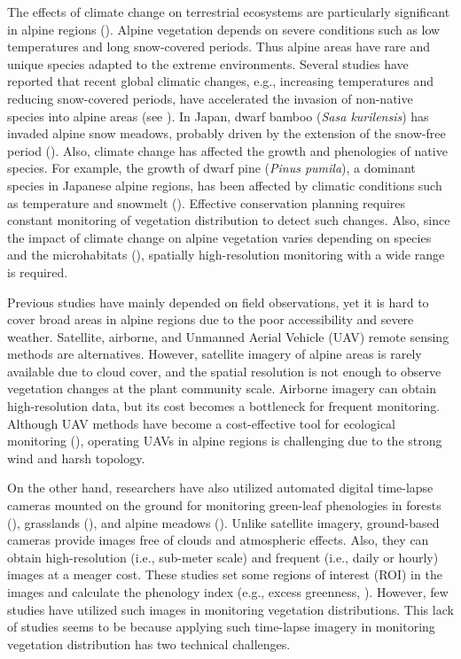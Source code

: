 \documentclass{article}
\begin{document}
The effects of climate change on terrestrial ecosystems are particularly significant in alpine regions (\cite{IPCC2007}). Alpine vegetation depends on severe conditions such as low temperatures and long snow-covered periods. Thus alpine areas have rare and unique species adapted to the extreme environments. Several studies have reported that recent global climatic changes, e.g., increasing temperatures and reducing snow-covered periods, have accelerated the invasion of non-native species into alpine areas (see \cite{Alexander2016AlpBotany}). In Japan, dwarf bamboo (\emph{Sasa kurilensis}) has invaded alpine snow meadows, probably driven by the extension of the snow-free period (\cite{Kudo2011EcoEvo}). Also, climate change has affected the growth and phenologies of native species. For example, the growth of dwarf pine (\emph{Pinus pumila}), a dominant species in Japanese alpine regions, has been affected by climatic conditions such as temperature and snowmelt (\cite{Amagai2015EcoRes}). Effective conservation planning requires constant monitoring of vegetation distribution to detect such changes. Also, since the impact of climate change on alpine vegetation varies depending on species and the microhabitats (\cite{Kudo2010AAA}), spatially high-resolution monitoring with a wide range is required.

Previous studies have mainly depended on field observations, yet it is hard to cover broad areas in alpine regions due to the poor accessibility and severe weather. Satellite, airborne, and Unmanned Aerial Vehicle (UAV) remote sensing methods are alternatives. However, satellite imagery of alpine areas is rarely available due to cloud cover, and the spatial resolution is not enough to observe vegetation changes at the plant community scale. Airborne imagery can obtain high-resolution data, but its cost becomes a bottleneck for frequent monitoring. Although UAV methods have become a cost-effective tool for ecological monitoring (\cite{Baena2017PLOSONE}), operating UAVs in alpine regions is challenging due to the strong wind and harsh topology.

On the other hand, researchers have also utilized automated digital time-lapse cameras mounted on the ground for monitoring green-leaf phenologies in forests (\cite{Richardson2009EcolAppl}), grasslands (\cite{Browning2017RemSen}), and alpine meadows (\cite{IdeOguma2013EcolInfom}). Unlike satellite imagery, ground-based cameras provide images free of clouds and atmospheric effects. Also, they can obtain high-resolution (i.e., sub-meter scale) and frequent (i.e., daily or hourly) images at a meager cost. These studies set some regions of interest (ROI) in the images and calculate the phenology index (e.g., excess greenness, \cite{Woebbecke1995ASAE}). However, few studies have utilized such images in monitoring vegetation distributions. This lack of studies seems to be because applying such time-lapse imagery in monitoring vegetation distribution has two technical challenges.
\end{document}

